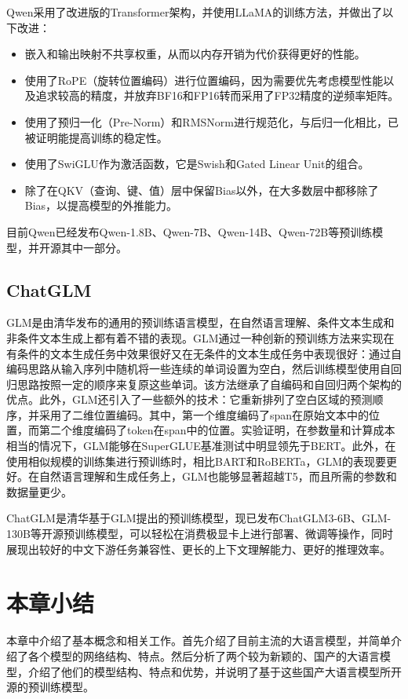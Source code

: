\documentclass[
    decl-page,  %
    ,fontset = win, %
  ]{njuthesis}
\begin{document}
Qwen采用了改进版的Transformer架构，并使用LLaMA\cite{touvron2023llama}的训练方法，并做出了以下改进：
\begin{itemize}
    \item 嵌入和输出映射不共享权重，从而以内存开销为代价获得更好的性能。
    \item 使用了RoPE（旋转位置编码）\cite{su2024roformer}进行位置编码，因为需要优先考虑模型性能以及追求较高的精度，并放弃BF16和FP16转而采用了FP32精度的逆频率矩阵。
    \item 使用了预归一化（Pre-Norm）和RMSNorm进行规范化，与后归一化相比，已被证明能提高训练的稳定性。
    \item 使用了SwiGLU作为激活函数，它是Swish和Gated Linear Unit的组合。
    \item 除了在QKV（查询、键、值）层中保留Bias以外，在大多数层中都移除了Bias，以提高模型的外推能力。
\end{itemize}

目前Qwen已经发布Qwen-1.8B、Qwen-7B、Qwen-14B、Qwen-72B等预训练模型，并开源其中一部分。

\subsection{ChatGLM}
GLM\cite{du2021glm}是由清华发布的通用的预训练语言模型，在自然语言理解、条件文本生成和非条件文本生成上都有着不错的表现。GLM通过一种创新的预训练方法来实现在有条件的文本生成任务中效果很好又在无条件的文本生成任务中表现很好：通过自编码思路从输入序列中随机将一些连续的单词设置为空白，然后训练模型使用自回归思路按照一定的顺序来复原这些单词。该方法继承了自编码和自回归两个架构的优点。此外，GLM还引入了一些额外的技术：它重新排列了空白区域的预测顺序，并采用了二维位置编码。其中，第一个维度编码了span在原始文本中的位置，而第二个维度编码了token在span中的位置。实验证明，在参数量和计算成本相当的情况下，GLM能够在SuperGLUE基准测试中明显领先于BERT。此外，在使用相似规模的训练集进行预训练时，相比BART\cite{lewis2019bart}和RoBERTa\cite{liu2019roberta}，GLM的表现要更好。在自然语言理解和生成任务上，GLM也能够显著超越T5，而且所需的参数和数据量更少。

ChatGLM是清华基于GLM提出的预训练模型，现已发布ChatGLM3-6B、GLM-130B\cite{zeng2022glm}等开源预训练模型，可以轻松在消费极显卡上进行部署、微调等操作，同时展现出较好的中文下游任务兼容性、更长的上下文理解能力、更好的推理效率。

\section{本章小结}
本章中介绍了基本概念和相关工作。首先介绍了目前主流的大语言模型，并简单介绍了各个模型的网络结构、特点。然后分析了两个较为新颖的、国产的大语言模型，介绍了他们的模型结构、特点和优势，并说明了基于这些国产大语言模型所开源的预训练模型。
\end{document}
